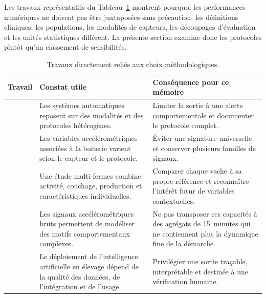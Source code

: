 Les travaux représentatifs du Tableau~\ref{tab:revue_ciblee} montrent pourquoi les
performances numériques ne doivent pas être juxtaposées sans précaution: les définitions
cliniques, les populations, les modalités de capteurs, les découpages d'évaluation et les
unités statistiques diffèrent. La présente section examine donc les protocoles plutôt qu'un
classement de sensibilités.

\begin{table}[H]
    \centering
    \small
    \caption{Travaux directement reliés aux choix méthodologiques.}
    \label{tab:revue_ciblee}
    \begin{tabular}{>{\raggedright\arraybackslash}p{3.0cm}
                    >{\raggedright\arraybackslash}p{4.7cm}
                    >{\raggedright\arraybackslash}p{6.0cm}}
        \toprule
        \textbf{Travail} & \textbf{Constat utile} & \textbf{Conséquence pour ce mémoire} \\
        \midrule
        \citep{alsaaod2019automatic}
        & Les systèmes automatiques reposent sur des modalités et des protocoles hétérogènes.
        & Limiter la sortie à une alerte comportementale et documenter le protocole complet. \\
        \addlinespace
        \citep{oleary2020accelerometers}
        & Les variables accélérométriques associées à la boiterie varient selon le capteur et
          le protocole.
        & Éviter une signature universelle et conserver plusieurs familles de signaux. \\
        \addlinespace
        \citep{lavrova2023lameness}
        & Une étude multi-fermes combine activité, couchage, production et caractéristiques
          individuelles.
        & Comparer chaque vache à sa propre référence et reconnaître l'intérêt futur de
          variables contextuelles. \\
        \addlinespace
        \citep{balasso2023behaviour}
        & Les signaux accélérométriques bruts permettent de modéliser des motifs
          comportementaux complexes.
        & Ne pas transposer ces capacités à des agrégats de 15~minutes qui ne contiennent
          plus la dynamique fine de la démarche. \\
        \addlinespace
        \citep{palma2025scoping}
        & Le déploiement de l'intelligence artificielle en élevage dépend de la qualité des
          données, de l'intégration et de l'usage.
        & Privilégier une sortie traçable, interprétable et destinée à une vérification
          humaine. \\
        \bottomrule
    \end{tabular}
\end{table}
